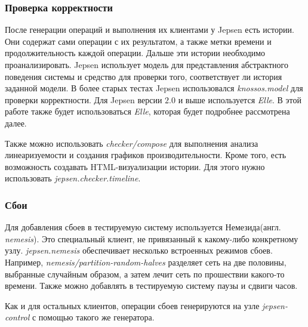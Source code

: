 \documentclass[12pt,  openany]{book}
\begin{document}
\subsubsection{Проверка корректности}
После генерации операций и выполнения их клиентами у Jepsen есть истории. Они содержат сами операции с их результатом, а также метки времени и продолжительность каждой операции.  Дальше эти истории необходимо проанализировать. Jepsen использует модель для представления абстрактного поведения системы и средство для проверки того, соответствует ли история заданной модели.  В более старых тестах Jepsen использовался \textit{knossos.model} для проверки корректности.   Для Jepsen версии $2.0$ и выше используется \textit{Elle}. В этой работе также будет использоваться  \textit{Elle}, которая будет подробнее рассмотрена далее.
\par Также можно использовать \textit{checker/compose} для выполнения анализа линеаризуемости и создания графиков производительности. Кроме того, есть возможность создавать HTML-визуализации истории. Для этого нужно использовать \textit{jepsen.checker.timeline}.

\subsubsection{Сбои}
Для добавления сбоев в тестируемую систему используется Немезида(англ. \textit{nemesis}). Это специальный клиент, не привязанный к какому-либо конкретному узлу.  \textit{jepsen.nemesis} обеспечивает несколько встроенных режимов  сбоев.  Например, \textit{nemesis/partition-random-halves} разделяет сеть на две половины, выбранные случайным образом, а затем лечит сеть по прошествии какого-то времени. Также можно добавлять в тестируемую систему паузы и сдвиги часов.
\par Как и для остальных клиентов, операции сбоев генерируются на узле \textit{jepsen-control} с помощью такого же генератора. 
\end{document}
